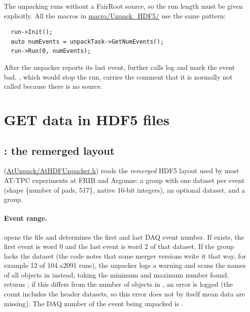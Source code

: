 The unpacking runs without a FairRoot source, so the run length must be given explicitly. All the
macros in \url{macro/Unpack_HDF5/} use the same pattern:
\begin{verbatim}
  run->Init();
  auto numEvents = unpackTask->GetNumEvents();
  run->Run(0, numEvents);
\end{verbatim}
After the unpacker reports its last event, further  calls log
 and mark the event bad. , which
would stop the run, carries the comment that it is normally not called because there is no source.

\section{GET data in HDF5 files}
\label{sec:unp-hdf5}

\subsection{: the remerged layout}

 (\url{AtUnpack/AtHDFUnpacker.h}) reads the \emph{remerged} HDF5 layout used by
most AT-TPC experiments at FRIB and Argonne: a group  with one dataset
 per event (shape \{number of pads, 517\}, native 16-bit integers), an optional
 dataset, and a  group.

\paragraph{Event range.}  opens the file and determines the first and last DAQ event
number. If  exists, the first event is word 0 and the last event is word 2 of that
dataset. If the  group lacks the  dataset (the code notes that some merger
versions write it that way, for example 12 of 104 a2091 runs), the unpacker logs a warning and
scans the names of all objects in  instead, taking the minimum and maximum number
found.  returns ; if this differs from the number of
objects in , an error is logged (the count includes the header datasets, so this error
does not by itself mean data are missing). The DAQ number of the event being unpacked is
.


